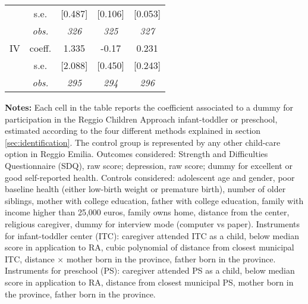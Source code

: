 \begin{table}[H]
\begin{centering}
\begin{tabular}{ r c ccc}
	 & s.e.	 & [0.487]	 & [0.106]	 & [0.053]	\\
	 & \textit{obs.}	 & \textit{326}	 & \textit{325}	 & \textit{327}	\\
IV	 & coeff.	 & 1.335	 & -0.17	 & 0.231	\\
	 & s.e.	 & [2.088]	 & [0.450]	 & [0.243]	\\
	 & \textit{obs.}	 & \textit{295}	 & \textit{294}	 & \textit{296}	\\
\hline 
\end{tabular} 
\par\end{centering} 
\vspace{2ex}
\begin{footnotesize}
\textbf{Notes:} Each cell in the table reports the coefficient associated to a dummy for participation in the Reggio Children Approach infant-toddler or preschool, estimated according to the four different methods explained in section  \ref{sec:identification}. 
The control group is represented by any other child-care option in Reggio Emilia. 
Outcomes considered: Strength and Difficulties Questionnaire (SDQ), raw score; depression, raw score; dummy for excellent or good self-reported health. Controls considered: adolescent age and gender, poor baseline health (either low-birth weight or premature birth), number of older siblings, mother with college education, father with college education, family with income higher than 25,000 euros, family owns home, distance from the center, religious caregiver, dummy for interview mode (computer vs paper). 
Instruments for infant-toddler center (ITC): caregiver attended ITC as a child, below median score in application to RA, cubic polynomial of distance from closest municipal ITC, distance $\times$ mother born in the province, father born in the province.
Instruments for preschool (PS): caregiver attended PS as a child, below median score in application to RA, distance from closest municipal PS, mother born in the province, father born in the province.
\end{footnotesize}
\end{table}
